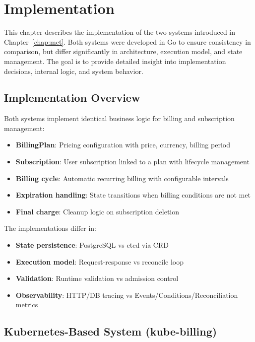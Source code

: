 \chapter{Implementation}\label{chap:impl}

This chapter describes the implementation of the two systems introduced in Chapter~\ref{chap:met}. Both systems were developed in Go to ensure consistency in comparison, but differ significantly in architecture, execution model, and state management. The goal is to provide detailed insight into implementation decisions, internal logic, and system behavior.

\section{Implementation Overview}

Both systems implement identical business logic for billing and subscription management:
\begin{itemize}
    \item \textbf{BillingPlan}: Pricing configuration with price, currency, billing period
    \item \textbf{Subscription}: User subscription linked to a plan with lifecycle management
    \item \textbf{Billing cycle}: Automatic recurring billing with configurable intervals
    \item \textbf{Expiration handling}: State transitions when billing conditions are not met
    \item \textbf{Final charge}: Cleanup logic on subscription deletion
\end{itemize}

The implementations differ in:
\begin{itemize}
    \item \textbf{State persistence}: PostgreSQL vs etcd via CRD
    \item \textbf{Execution model}: Request-response vs reconcile loop
    \item \textbf{Validation}: Runtime validation vs admission control
    \item \textbf{Observability}: HTTP/DB tracing vs Events/Conditions/Reconciliation metrics
\end{itemize}

\section{Kubernetes-Based System (kube-billing)}

